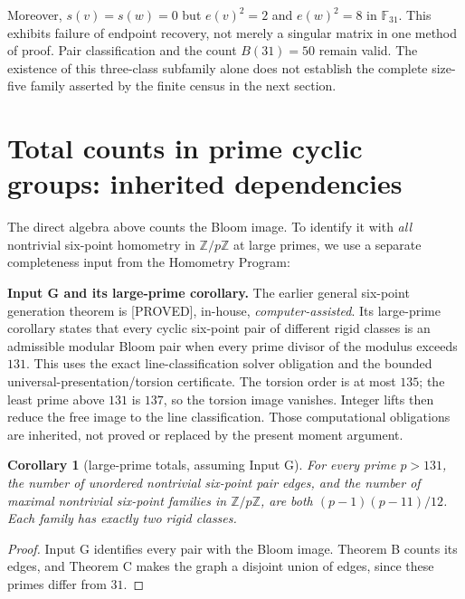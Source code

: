 \documentclass[11pt]{article}
\newtheorem{corollary}{Corollary}
\newcommand{\F}{\mathbb F}
\newcommand{\Z}{\mathbb Z}
\newcommand{\status}[1]{\textsf{[#1]}}
\begin{document}
Moreover, $s(v)=s(w)=0$ but $e(v)^2=2$ and $e(w)^2=8$ in $\F_{31}$.
This exhibits failure of endpoint recovery, not merely a singular matrix
in one method of proof. Pair classification and the count $B(31)=50$
remain valid. The existence of this three-class subfamily alone does not
establish the complete size-five family asserted by the finite census
in the next section.

\newpage
\section{Total counts in prime cyclic groups: inherited dependencies}\label{sec:totals}
The direct algebra above counts the Bloom image. To identify it with
\emph{all} nontrivial six-point homometry in $\Z/p\Z$ at large primes,
we use a separate completeness input from the Homometry Program:

\medskip\noindent\textbf{Input G and its large-prime corollary.}
The earlier general six-point generation theorem is \status{PROVED},
in-house, \emph{computer-assisted}. Its large-prime corollary states
that every cyclic six-point pair of different rigid classes is an
admissible modular Bloom pair when every prime divisor of the modulus
exceeds $131$. This uses the exact line-classification solver obligation
and the bounded universal-presentation/torsion certificate. The torsion
order is at most $135$; the least prime above $131$ is $137$, so the
torsion image vanishes. Integer lifts then reduce the free image to the
line classification. Those computational obligations are inherited,
not proved or replaced by the present moment argument.

\begin{corollary}[large-prime totals, assuming Input G]
For every prime $p>131$, the number of unordered nontrivial six-point
pair edges, and the number of maximal nontrivial six-point families in
$\Z/p\Z$, are both $(p-1)(p-11)/12$. Each family has exactly two
rigid classes.
\end{corollary}
\begin{proof}
Input G identifies every pair with the Bloom image. Theorem B counts
its edges, and Theorem C makes the graph a disjoint union of edges,
since these primes differ from $31$.
\end{proof}
\end{document}
